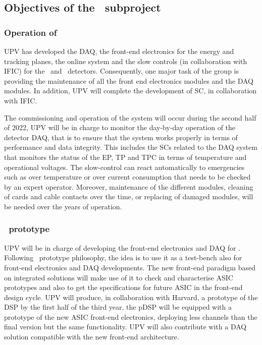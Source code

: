 \subsection{Objectives of the \sUPV\ subproject}
\label{sec.obj.upv}
\subsubsection*{Operation of \Next}

UPV has developed the DAQ, the front-end electronics for the energy and tracking planes, the online system and the slow controls (in collaboration with IFIC) for the \NEW\ and \Next\ detectors. Consequently, one major task of the group is   providing the maintenance of all the front end electronics modules and the DAQ modules. In addition, UPV will complete the development of SC, in collaboration with IFIC. 

The commissioning and operation of the system will occur during the second half of 2022, UPV will be in charge to monitor the day-by-day operation of the detector DAQ, that is to ensure that the system works properly in terms of performance and data integrity. This includes the SCs related to the DAQ system that monitors the status of the EP, TP and TPC in terms of temperature and operational voltages. The slow-control can react automatically to emergencies such as over temperature or over current consumption that needs to be checked by an expert operator. Moreover, maintenance of the different modules, cleaning of cards and cable contacts over the time, or replacing of damaged modules, will be needed over the years of operation.


\subsubsection*{\HDEMO\ prototype}

UPV will be in charge of developing the front-end electronics and DAQ for \HDEMO.
Following \HDEMO\  prototype philosophy, the idea is to use it as a test-bench also for front-end electronics and DAQ developments. The new front-end paradigm based on integrated solutions will make use of it to check and characterise ASIC prototypes and also to get the specifications for future ASIC in the front-end design cycle. UPV will produce, in collaboration with Harvard, a prototype of the DSP by the first half of the third year.  the pDSP will be equipped with a prototype of the new ASIC front-end electronics, deploying less channels than the final version but the same functionality. UPV will also contribute with a DAQ solution compatible with the new front-end architecture.

